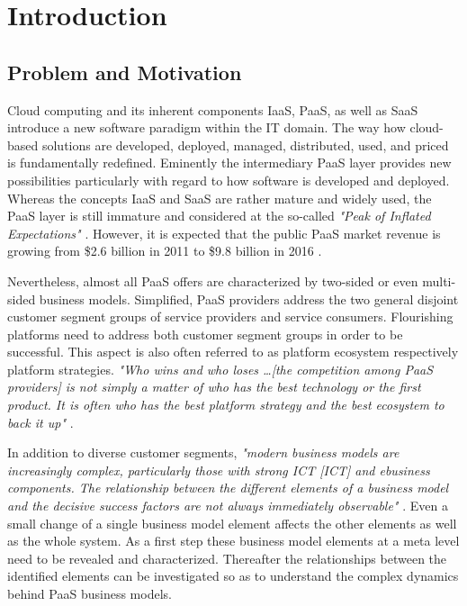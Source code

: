 \chapter{Introduction}\label{ch:intro}

\section{Problem and Motivation}\label{ch:intro:mo}


Cloud computing and its inherent components \acf{IaaS}, \acf{PaaS}, as well as \acf{SaaS} introduce a new software paradigm within the \acf{IT} domain. The way how cloud-based solutions are developed, deployed, managed, distributed, used, and priced is fundamentally redefined. Eminently the intermediary \ac{PaaS} layer provides new possibilities particularly with regard to how software is developed and deployed. Whereas the concepts \ac{IaaS} and \ac{SaaS} are rather mature and widely used, the \ac{PaaS} layer is still immature and considered at the so-called \textit{"Peak of Inflated Expectations"} \citep[p. 5]{Smith2012}. However, it is expected that the public \ac{PaaS} market revenue is growing from \$2.6 billion in 2011 to \$9.8 billion in 2016 \citep[p. 22]{Hendrick2012a}.

Nevertheless, almost all \ac{PaaS} offers are characterized by two-sided or even multi-sided business models. Simplified, \ac{PaaS} providers address the two general disjoint customer segment groups of service providers and service consumers. Flourishing platforms need to address both customer segment groups in order to be successful. This aspect is also often referred to as platform ecosystem respectively platform strategies. \textit{"Who wins and who loses \ldots [the competition among \ac{PaaS} providers] is not simply a matter of who has the best technology or the first product. It is often who has the best platform strategy and the best ecosystem to back it up"} \citep[p. 34]{Cusumano2010}.

In addition to diverse customer segments, \textit{"modern business models are increasingly complex, particularly those with strong ICT [\acl{ICT}] and ebusiness components. The relationship between the different elements of a business model and the decisive success factors are not always immediately observable"} \citep[p. 14]{Osterwalder2005}. Even a small change of a single business model element affects the other elements as well as the whole system. As a first step these business model elements at a meta level need to be revealed and characterized. Thereafter the relationships between the identified elements can be investigated so as to understand the complex dynamics behind \ac{PaaS} business models.

